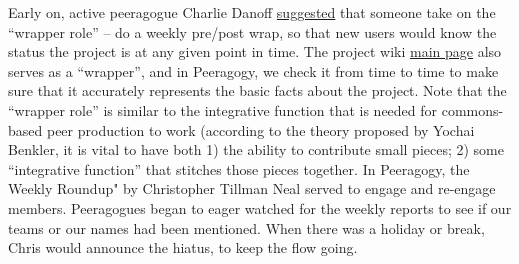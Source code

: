 Early on, active peeragogue Charlie Danoff
\href{http://socialmediaclassroom.com/host/peeragogy/wiki/rolesdivision-labor}{suggested}
that someone take on the ``wrapper role'' -- do a weekly pre/post wrap,
so that new users would know the status the project is at any given
point in time. The project wiki
\href{http://socialmediaclassroom.com/host/peeragogy/}{main page} also
serves as a ``wrapper'', and in Peeragogy, we check it from time to time
to make sure that it accurately represents the basic facts about the
project. Note that the ``wrapper role'' is similar to the integrative
function that is needed for commons-based peer production to work
(according to the theory proposed by Yochai Benkler, it is vital to have
both 1) the ability to contribute small pieces; 2) some ``integrative
function'' that stitches those pieces together. In Peeragogy, the Weekly
Roundup" by Christopher Tillman Neal served to engage and re-engage
members. Peeragogues began to eager watched for the weekly reports to
see if our teams or our names had been mentioned. When there was a
holiday or break, Chris would announce the hiatus, to keep the flow
going.
